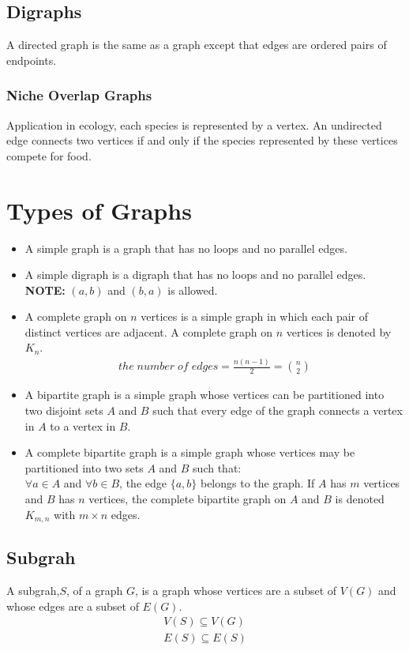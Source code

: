 \documentclass{article}
\begin{document}
\begin{spacing}{1.5}
\subsection{Digraphs}
A directed graph is the same as a graph except that edges are ordered pairs of endpoints.
\subsubsection{Niche Overlap Graphs}
Application in ecology, each species is represented by a vertex. An undirected edge connects two vertices if and only if the species represented by these vertices compete for food.
\section{Types of Graphs}
\begin{itemize}
    \item A simple graph is a graph that has no loops and no parallel edges.
    \item A simple digraph is a digraph that has no loops and no parallel edges.\\
    \textbf{NOTE:} $(a,b)$ and $(b,a)$ is allowed. 
    \item A complete graph on $n$ vertices is a simple graph in which each pair of distinct vertices are adjacent. A complete graph on $n$ vertices is denoted by $K_n$.
    \begin{align}
        the \;number\; of\; edges = \frac{n(n-1)}{2} =\binom{n}{2} 
    \end{align}
    \item A bipartite graph is a simple graph whose vertices can be partitioned into two disjoint sets $A$ and $B$ such that every edge of the graph connects a vertex in $A$ to a vertex in $B$.
    \item A complete bipartite graph is a simple graph whose vertices may be partitioned into two sets $A$ and $B$ such that:\\
    $\forall a \in A$ and $\forall b \in B$, the edge $\{a,b\}$ belongs to the graph. 
    If $A$ has $m$ vertices and $B$ has $n$ vertices, the complete bipartite graph on $A$ and $B$ is denoted $K_{m,n}$ with $m \times n $ edges.
    
\end{itemize}
\subsection{Subgrah}
A subgrah,$S$, of a graph $G$, is a graph whose vertices are a subset of $V(G)$ and whose edges are a subset of $E(G)$. 
\begin{align}
    V(S) \subseteq V(G)\\
    E(S) \subseteq E(S)
\end{align}

\end{spacing}
\end{document}
